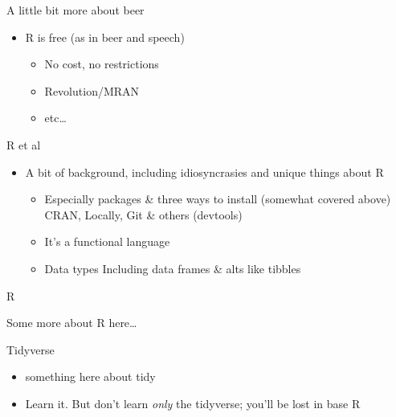 \documentclass[
  ignorenonframetext,
]{beamer}
\providecommand{\tightlist}{%
  \setlength{\itemsep}{0pt}\setlength{\parskip}{0pt}}
\begin{document}
\begin{frame}{A little bit more about beer}
\protect\hypertarget{a-little-bit-more-about-beer}{}

\begin{itemize}
\tightlist
\item
  R is free (as in beer and speech)

  \begin{itemize}
  \tightlist
  \item
    No cost, no restrictions
  \item
    Revolution/MRAN
  \item
    etc\ldots{}
  \end{itemize}
\end{itemize}

\end{frame}

\begin{frame}{R et al}
\protect\hypertarget{r-et-al}{}

\begin{itemize}
\tightlist
\item
  A bit of background, including idiosyncrasies and unique things about
  R

  \begin{itemize}
  \tightlist
  \item
    Especially packages \& three ways to install (somewhat covered
    above) CRAN, Locally, Git \& others (devtools)
  \item
    It's a functional language
  \item
    Data types Including data frames \& alts like tibbles
  \end{itemize}
\end{itemize}

\end{frame}

\begin{frame}{R}
\protect\hypertarget{r}{}

Some more about R here\ldots{}

\end{frame}

\begin{frame}{Tidyverse}
\protect\hypertarget{tidyverse}{}

\begin{itemize}
\tightlist
\item
  something here about tidy
\item
  Learn it. But don't learn \emph{only} the tidyverse; you'll be lost in
  base R
\end{itemize}

\end{frame}
\end{document}
